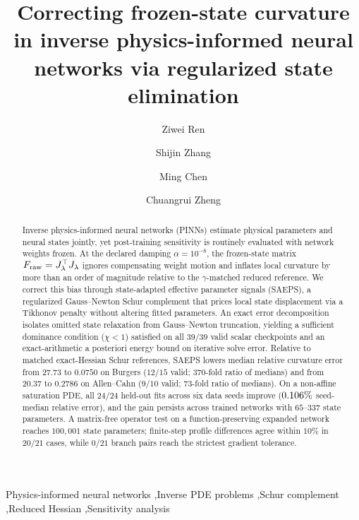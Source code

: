 \documentclass[preprint,11pt]{elsarticle}
\newcommand{\Fraw}{F_{\mathrm{raw}}}
\begin{document}
\begin{frontmatter}
\title{Correcting frozen-state curvature in inverse physics-informed neural networks via regularized state elimination}

\author[1]{Ziwei Ren}
\author[1,2]{Shijin Zhang}
\author[1,2]{Ming Chen}
\author[1]{Chuangrui Zheng}


\begin{abstract}
Inverse physics-informed neural networks (PINNs) estimate physical parameters and neural states jointly, yet post-training sensitivity is routinely evaluated with network weights frozen.
At the declared damping $\alpha=10^{-8}$, the frozen-state matrix $\Fraw=\Jl^\top\Jl$ ignores compensating weight motion and inflates local curvature by more than an order of magnitude relative to the $\gamma$-matched reduced reference.
We correct this bias through state-adapted effective parameter signals (SAEPS), a regularized Gauss--Newton Schur complement that prices local state displacement via a Tikhonov penalty without altering fitted parameters.
An exact error decomposition isolates omitted state relaxation from Gauss--Newton truncation, yielding a sufficient dominance condition ($\chi<1$) satisfied on all $39/39$ valid scalar checkpoints and an exact-arithmetic a posteriori energy bound on iterative solve error.
Relative to matched exact-Hessian Schur references, SAEPS lowers median relative curvature error from $27.73$ to $0.0750$ on Burgers ($12/15$ valid; $370$-fold ratio of medians) and from $20.37$ to $0.2786$ on Allen--Cahn ($9/10$ valid; $73$-fold ratio of medians).
On a non-affine saturation PDE, all $24/24$ held-out fits across six data seeds improve ($\num{0.106}\%$ seed-median relative error), and the gain persists across trained networks with $65$--$337$ state parameters.
A matrix-free operator test on a function-preserving expanded network reaches $100{,}001$ state parameters; finite-step profile differences agree within $10\%$ in $20/21$ cases, while $0/21$ branch pairs reach the strictest gradient tolerance.
\end{abstract}

\begin{keyword}
Physics-informed neural networks \sep Inverse PDE problems \sep Schur complement \sep Reduced Hessian \sep Sensitivity analysis
\end{keyword}
\end{frontmatter}
\end{document}
